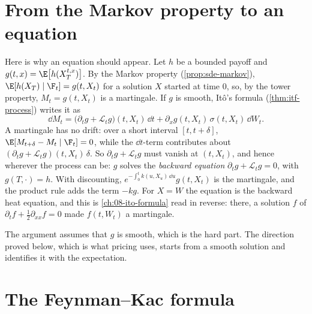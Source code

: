 \section{From the Markov property to an equation}\label{sec:fk-heuristic}

Here is why an equation should appear. Let $h$ be a bounded payoff and
$g(t,x)=\E\big[h(X^{t,x}_T)\big]$. By the Markov property (\cref{prop:sde-markov}),
$\E[h(X_T)\mid\F_t]=g(t,X_t)$ for a solution $X$ started at time $0$, so, by the tower property,
$M_t=g(t,X_t)$ is a martingale. If $g$ is smooth, It\^o's formula
(\cref{thm:itf-process}) writes it as
\[
  \dd M_t=\big(\partial_tg+\mathcal L_tg\big)(t,X_t)\,\dd t+\partial_xg(t,X_t)\,\sigma(t,X_t)\,\dd W_t .
\]
A martingale has no drift: over a short interval $[t,t+\delta]$, $\E[M_{t+\delta}-M_t\mid\F_t]=0$,
while the $\dd t$-term contributes about $(\partial_tg+\mathcal L_tg)(t,X_t)\,\delta$. So
$\partial_tg+\mathcal L_tg$ must vanish at $(t,X_t)$, and hence wherever the process can be:
$g$ solves the \emph{backward equation} $\partial_tg+\mathcal L_tg=0$, with $g(T,\cdot)=h$. With
discounting, $e^{-\int_0^tk(u,X_u)\,\dd u}g(t,X_t)$ is the martingale, and the product rule
adds the term $-kg$. For $X=W$ the equation is the backward heat equation, and this is
\cref{ch:08-ito-formula} read in reverse: there, a solution $f$ of
$\partial_tf+\frac12\partial_{xx}f=0$ made $f(t,W_t)$ a martingale.

The argument assumes that $g$ is smooth, which is the hard part. The direction proved below,
which is what pricing uses, starts from a smooth solution and identifies it with the expectation.

\section{The Feynman--Kac formula}\label{sec:fk-theorem}


